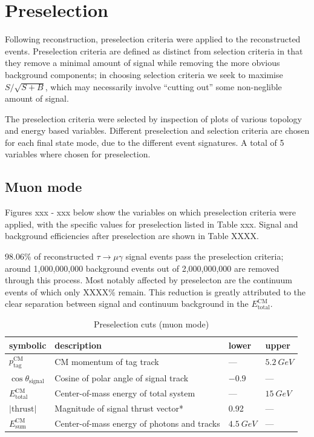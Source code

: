 \documentclass[12pt]{thesis}  %
\begin{document}
\pagebreak


\chapter{Preselection}

Following reconstruction, preselection criteria were applied to the reconstructed events. Preselection criteria are defined as distinct from selection criteria in that they remove a minimal amount of signal while removing the more obvious background components; in choosing selection criteria we seek to maximise $S/\sqrt{S+B}$, which may necessarily involve ``cutting out'' some non-neglible amount of signal.

The preselection criteria were selected by inspection of plots of various topology and energy based variables. Different preselection and selection criteria are chosen for each final state mode, due to the different event signatures. A total of 5 variables where chosen for preselection.

\section{Muon mode}

Figures xxx - xxx below show the variables on which preselection criteria were applied, with the specific values for preselection listed in Table xxx. Signal and background efficiencies after preselection are shown in Table XXXX.

98.06\% of reconstructed $\tau\to\mu\gamma$ signal events pass the preselection criteria; around 1,000,000,000 background events out of 2,000,000,000 are removed through this process. Most notably affected by preselecton are the continuum events of which only XXXX\% remain. This reduction is greatly attributed to the clear separation between signal and continuum background in the $E^{\text{CM}}_{\text{total}}$.

\begin{table}[h]
\centering
\begin{tabular}{llll}
\textbf{symbolic} & \textbf{description} & \textbf{lower} & \textbf{upper} \\ \hline
$p_{\text{tag}}^{\text{CM}}$  & CM momentum of tag track & --- & $\SI{5.2}{GeV}$ \\
$\cos\theta_{\text{signal}}$ & Cosine of polar angle of signal track & $-0.9$ & --- \\
$E_{\text{total}}^{\text{CM}}$ & Center-of-mass energy of total system  & --- & $\SI{15}{GeV}$ \\
$\lvert\text{thrust}\rvert$ & Magnitude of signal thrust vector* & 0.92 & --- \\
$E_{\text{sum}}^{\text{CM}}$ & Center-of-mass energy of photons and tracks & $\SI{4.5}{GeV}$ & ---
\end{tabular}
\caption{Preselection cuts (muon mode)}
\label{my-label}
\end{table}
\end{document}
